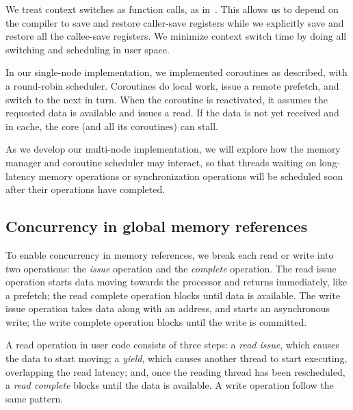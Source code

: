 \documentclass[10pt,nocopyrightspace,preprint]{sigplanconf}
\begin{document}
We treat context switches as function calls, as in~\cite{charm}. This allows us 
to depend on the compiler to save and restore caller-save registers while we explicitly save and restore all the callee-save registers.  We minimize
context switch time by doing all switching and scheduling in user space.

In our single-node implementation, we implemented coroutines
as described, with a round-robin scheduler. Coroutines do local work,
issue a remote prefetch, and switch to the next in turn.  When the
coroutine is reactivated, it assumes the requested data is available
and issues a read.  If the data is not yet received and in cache, the core
(and all its coroutines) can stall.

As we develop our multi-node implementation, we will explore how the memory manager and coroutine scheduler may
interact, so that threads waiting on long-latency memory operations or
synchronization operations will be scheduled soon after their
operations have completed.

\subsection{Concurrency in global memory references}

To enable concurrency in memory references, we break each read or
write into two operations: the {\em issue} operation and the {\em
  complete} operation. The read issue operation starts data moving
towards the processor and returns immediately, like a prefetch; the
read complete operation blocks until data is available. The write
issue operation takes data along with an address, and starts an
asynchronous write; the write complete operation blocks until the
write is committed.

A read operation in user code consists of three steps: a {\em read
  issue}, which causes the data to start moving; a {\em yield}, which
causes another thread to start executing, overlapping the read
latency; and, once the reading thread has been rescheduled, a {\em
  read complete} blocks until the data is available. A write operation
follow the same pattern.
\end{document}
